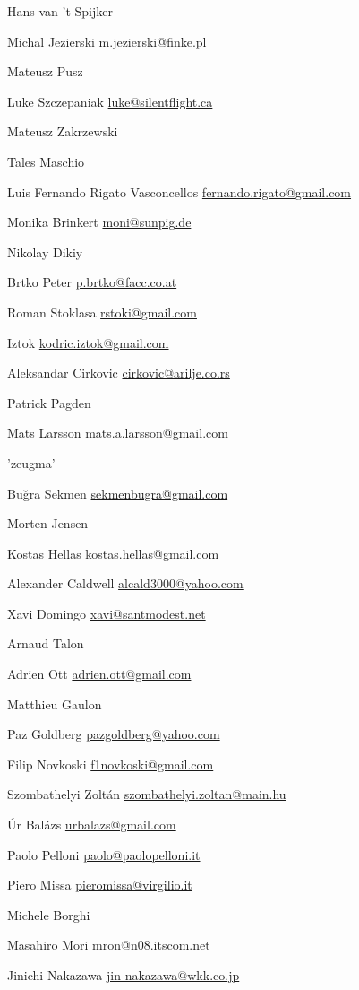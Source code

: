 \item Hans van 't Spijker
\item Michal Jezierski \url{m.jezierski@finke.pl}
\item*Mateusz Pusz
\item Luke Szczepaniak \url{luke@silentflight.ca}
\item Mateusz Zakrzewski
\item*Tales Maschio
\item Luis Fernando Rigato Vasconcellos \url{fernando.rigato@gmail.com}
\item Monika Brinkert \url{moni@sunpig.de}
\item Nikolay Dikiy
\item Brtko Peter \url{p.brtko@facc.co.at}
\item Roman Stoklasa \url{rstoki@gmail.com}
\item Iztok \url{kodric.iztok@gmail.com}
\item*Aleksandar Cirkovic \url{cirkovic@arilje.co.rs}
\item*Patrick Pagden
\item Mats Larsson \url{mats.a.larsson@gmail.com}
\item 'zeugma'
\item Buğra Sekmen \url{sekmenbugra@gmail.com}
\item Morten Jensen
\item Kostas Hellas \url{kostas.hellas@gmail.com}
\item Alexander Caldwell \url{alcald3000@yahoo.com}
\item Xavi Domingo \url{xavi@santmodest.net}
\item Arnaud Talon
\item Adrien Ott \url{adrien.ott@gmail.com}
\item Matthieu Gaulon
\item Paz Goldberg \url{pazgoldberg@yahoo.com}
\item Filip Novkoski \url{f1novkoski@gmail.com}
\item Szombathelyi Zolt\'an \url{szombathelyi.zoltan@main.hu}
\item \'Ur Bal\'azs \url{urbalazs@gmail.com}
\item Paolo Pelloni \url{paolo@paolopelloni.it}
\item Piero Missa \url{pieromissa@virgilio.it}
\item*Michele Borghi
\item Masahiro Mori \url{mron@n08.itscom.net}
\item Jinichi Nakazawa \url{jin-nakazawa@wkk.co.jp}
